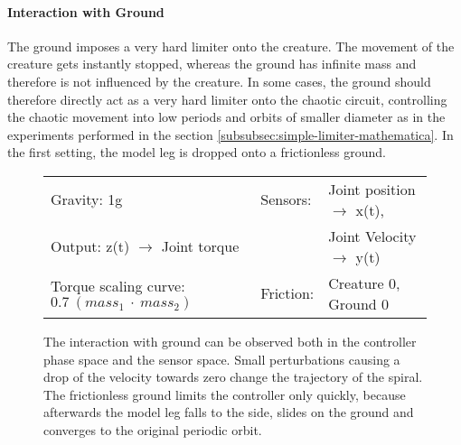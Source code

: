 \documentclass[main]{subfiles}
\begin{document}
\paragraph{Interaction with Ground} The ground imposes a very hard limiter onto the creature. %
%
The movement of the creature gets instantly stopped, whereas the ground has infinite mass and therefore is not influenced by the creature. %
%
In some cases, the ground should therefore directly act as a very hard limiter onto the chaotic circuit, controlling the chaotic movement into low periods and orbits of smaller diameter as in the experiments performed in the section \ref{subsubsec:simple-limiter-mathematica}. 
%
In the first setting, the model leg is dropped onto a frictionless ground. 
\begin{figure}[H]
	\centering
	\begin{minipage}{1.3\textwidth}
	\hspace*{-5em}
	\end{minipage}
	\caption[Limited chaotic controller controlling model leg on frictionless ground.]{The interaction with ground can be observed both in the controller phase space and the sensor space. Small perturbations causing a drop of the velocity towards zero change the trajectory of the spiral. The frictionless ground limits the controller only quickly, because afterwards the model leg falls to the side, slides on the ground and converges to the original periodic orbit.}
	\begin{tabular}{l|ll}
	\hline 
	Gravity: 1g  & Sensors: & Joint position \(\rightarrow\) x(t),\\
	 Output: z(t) \(\rightarrow\) Joint torque &  & Joint Velocity \(\rightarrow\) y(t) \\
	  Torque scaling curve: \(0.7~(mass_1~\cdot~mass_2)\) & Friction: & Creature 0, Ground 0 \\
	  \hline
	\end{tabular}
	
	\label{figure:limited-damped-model-leg-collision1}
\end{figure}
\end{document}

